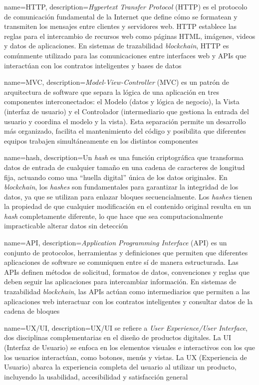 {
    name=HTTP,
    description={\textit{Hypertext Transfer Protocol} (HTTP) es el protocolo de comunicación fundamental de la Internet que define cómo se formatean y transmiten los mensajes entre clientes y servidores web. HTTP establece las reglas para el intercambio de recursos web como páginas HTML, imágenes, videos y datos de aplicaciones. En sistemas de trazabilidad \textit{blockchain}, HTTP es comúnmente utilizado para las comunicaciones entre interfaces web y APIs que interactúan con los contratos inteligentes y bases de datos}
}

{
    name=MVC,
    description={\textit{Model-View-Controller} (MVC) es un patrón de arquitectura de software que separa la lógica de una aplicación en tres componentes interconectados: el Modelo (datos y lógica de negocio), la Vista (interfaz de usuario) y el Controlador (intermediario que gestiona la entrada del usuario y coordina el modelo y la vista). Esta separación permite un desarrollo más organizado, facilita el mantenimiento del código y posibilita que diferentes equipos trabajen simultáneamente en los distintos componentes}
}

{
    name=hash,
    description={Un \textit{hash} es una función criptográfica que transforma datos de entrada de cualquier tamaño en una cadena de caracteres de longitud fija, actuando como una ``huella digital'' única de los datos originales. En \textit{blockchain}, los \textit{hashes} son fundamentales para garantizar la integridad de los datos, ya que se utilizan para enlazar bloques secuencialmente. Los \textit{hashes} tienen la propiedad de que cualquier modificación en el contenido original resulta en un \textit{hash} completamente diferente, lo que hace que sea computacionalmente impracticable alterar datos sin detección}
}

{
    name=API,
    description={\textit{Application Programming Interface} (API) es un conjunto de protocolos, herramientas y definiciones que permiten que diferentes aplicaciones de software se comuniquen entre sí de manera estructurada. Las APIs definen métodos de solicitud, formatos de datos, convenciones y reglas que deben seguir las aplicaciones para intercambiar información. En sistemas de trazabilidad \textit{blockchain}, las APIs actúan como intermediarios que permiten a las aplicaciones web interactuar con los contratos inteligentes y consultar datos de la cadena de bloques}
}   

{
    name=UX/UI,
    description={UX/UI se refiere a \textit{User Experience/User Interface}, dos disciplinas complementarias en el diseño de productos digitales. La UI (Interfaz de Usuario) se enfoca en los elementos visuales e interactivos con los que los usuarios interactúan, como botones, menús y vistas. La UX (Experiencia de Usuario) abarca la experiencia completa del usuario al utilizar un producto, incluyendo la usabilidad, accesibilidad y satisfacción general}
}

